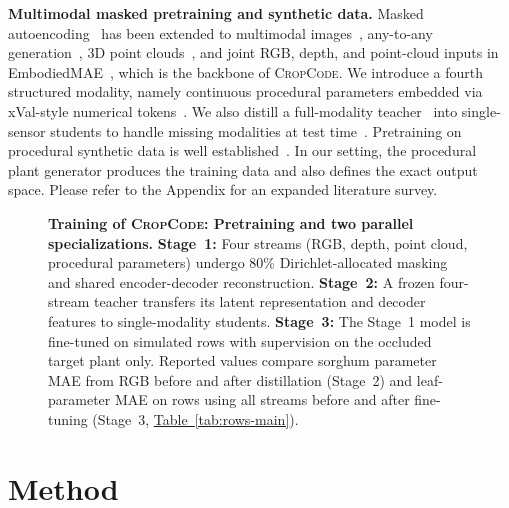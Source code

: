 \documentclass[10pt,twocolumn,letterpaper]{article}
\newcommand{\tabref}[1]{\hyperref[#1]{Table~\ref*{#1}}}
\newcommand{\appendixref}[1]{\hyperref[#1]{Appendix~\ref*{#1}}}
\newcommand{\method}{\textup{\textsc{CropCode}}}   %
\begin{document}
\noindent\textbf{Multimodal masked pretraining and synthetic data.}
Masked autoencoding~\citep{he2022mae} has been extended to multimodal images~\citep{bachmann2022multimae}, any-to-any generation~\citep{mizrahi2023fourm,bachmann2024fourm21}, 3D point clouds~\citep{pang2022pointmae}, and joint RGB, depth, and point-cloud inputs in EmbodiedMAE~\citep{dong2025embodiedmae}, which is the backbone of \method{}. We introduce a fourth structured modality, namely continuous procedural parameters embedded via xVal-style numerical tokens~\citep{golkar2023xval}. We also distill a full-modality teacher~\citep{hinton2015distillation} into single-sensor students to handle missing modalities at test time~\citep{wang2024robustmissing}. Pretraining on procedural synthetic data is well established~\citep{kataoka2020fractaldb,raistrick2023infinigen,greff2022kubric,tobin2017domainrand,fan2023intriguing}. In our setting, the procedural plant generator produces the training data and also defines the exact output space. Please refer to the Appendix for an expanded literature survey.


\begin{figure}[t]
  \centering
  \resizebox{\linewidth}{!}{}
      \vspace{-15pt}

    \caption{\textbf{Training of \method{}: Pretraining and two parallel specializations.}
    \textbf{Stage~1:} Four streams (RGB, depth, point cloud, procedural parameters) undergo 80\% Dirichlet-allocated masking and shared encoder-decoder reconstruction.
    \textbf{Stage~2:} A frozen four-stream teacher transfers its latent representation and decoder features to single-modality students.
    \textbf{Stage~3:} The Stage~1 model is fine-tuned on simulated rows with supervision on the occluded target plant only.
    Reported values compare sorghum parameter MAE from RGB before and after distillation (Stage~2) and leaf-parameter MAE on rows using all streams before and after fine-tuning (Stage~3, \tabref{tab:rows-main}).}
  \label{fig:arch}
\end{figure}


\section{Method}
\label{sec:method}
\end{document}
